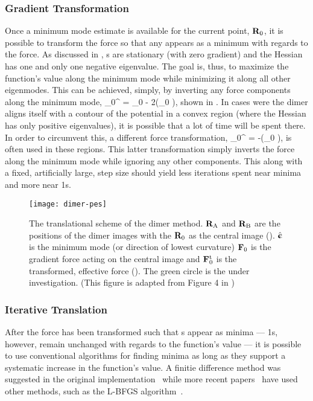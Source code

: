 \subsubsection{Gradient Transformation}
Once a minimum mode estimate is available for the current point, ${\mathrm{\mathbf{\bm{R}}}}_0$, it is possible to transform the force so that any  appears as a minimum with regards to the force.
As discussed in , s are stationary (with zero gradient) and the Hessian has one and only one negative eigenvalue.
The goal is, thus, to maximize the function's value along the minimum mode while minimizing it along all other eigenmodes.
This can be achieved, simply, by inverting any force components along the minimum mode,
\vF_0^ = \vF_0 - 2(\vF_0 \cdot \uvn)\uvn,
\eeq
shown in .
In cases were the dimer aligns itself with a contour of the potential in a convex region (where the Hessian has only positive eigenvalues), it is possible that a lot of time will be spent there.
In order to circumvent this, a different force transformation,
\vF_0^ = -(\vF_0 \cdot \uvn)\uvn ,
\eeq
is often used in these regions.
This latter transformation simply inverts the force along the minimum mode while ignoring any other components.
This along with a fixed, artificially large, step size should yield less iterations spent near minima and more near \sap1s.~\cite{dimer-original-1999}

\begin{SCfigure}[5.0][h]
\centering
    \texttt{[image: dimer-pes]}
    \caption{The translational scheme of the dimer method.
${\mathrm{\mathbf{\bm{R}}}}_\text{A}$ and ${\mathrm{\mathbf{\bm{R}}}}_\text{B}$ are the positions of the dimer images with the ${\mathrm{\mathbf{\bm{R}}}}_0$ as the central image ().
$\hat{{\mathrm{\mathbf{\bm{\upepsilon}}}}}$ is the minimum mode (or direction of lowest curvature)
${\mathrm{\mathbf{\bm{F}}}}_0$ is the gradient force acting on the central image and ${\mathrm{\mathbf{\bm{F}}}}_0^\text{t}$ is the transformed, effective force ().
The green circle is the  under investigation.
(This figure is adapted from Figure 4 in \cite{dimer-original-1999})
}
\label{fig:dimer-pes}
\end{SCfigure}

\subsubsection{Iterative Translation}
After the force has been transformed such that s appear as minima --- \sap1s, however, remain unchanged with regards to the function's value --- it is possible to use conventional algorithms for finding minima as long as they support a systematic increase in the function's value.
A finitie difference method was suggested in the original implementation~\cite{dimer-original-1999} while more recent papers~\cite{dimer-kastner-2008} have used other methods, such as the L-BFGS algorithm~\cite{lbfgs}.

